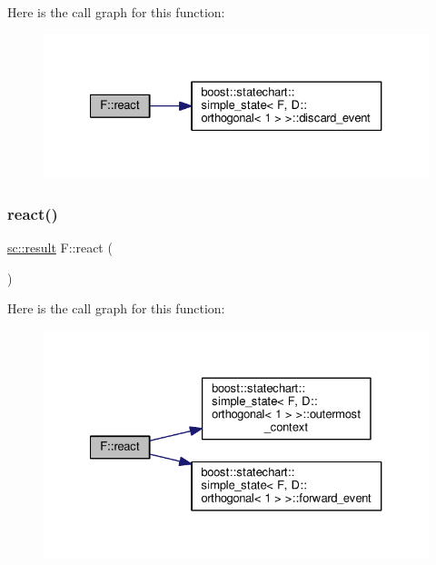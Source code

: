 Here is the call graph for this function\+:
\nopagebreak
\begin{figure}[H]
\begin{center}
\leavevmode
\includegraphics[width=327pt]{struct_f_ac04f4d9a86f61f20b462cd4e33aff19a_cgraph}
\end{center}
\end{figure}
\mbox{\label{struct_f_a376e5c76bdfdf428aba4503daec98e41}} 
\subsubsection{\texorpdfstring{react()}{react()}\hspace{0.1cm}{\footnotesize\ttfamily [2/4]}}
{\footnotesize\ttfamily \mbox{\hyperlink{namespaceboost_1_1statechart_abe807f6598b614d6d87bb951ecd92331}{sc\+::result}} F\+::react (\begin{DoxyParamCaption}\item[{const \mbox{\hyperlink{struct_ev_discard_never}{Ev\+Discard\+Never}} \&}]{ }\end{DoxyParamCaption})\hspace{0.3cm}{\ttfamily [inline]}}

Here is the call graph for this function\+:
\nopagebreak
\begin{figure}[H]
\begin{center}
\leavevmode
\includegraphics[width=327pt]{struct_f_a376e5c76bdfdf428aba4503daec98e41_cgraph}
\end{center}
\end{figure}
\mbox{\label{struct_f_abe8ebe7d32d3149a3c8623245b4c5c42}} 
